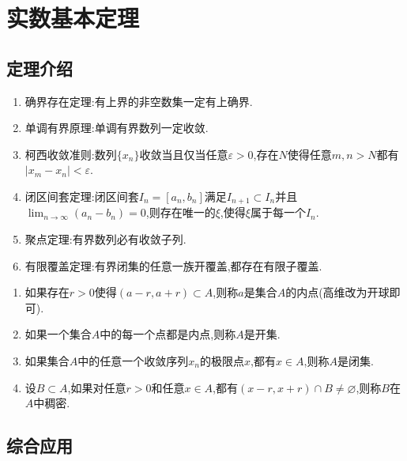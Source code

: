\documentclass[../../main.tex]{subfiles}
\begin{document}
\section{实数基本定理}

\subsection{定理介绍}

\begin{theorem}[实数基本定理]\label{theorem:实数基本定理}
\begin{enumerate}
\item 确界存在定理:有上界的非空数集一定有上确界.
\item 单调有界原理:单调有界数列一定收敛.
\item 柯西收敛准则:数列\(\{x_n\}\)收敛当且仅当任意\(\varepsilon > 0\),存在\(N\)使得任意\(m,n > N\)都有\(\vert x_m - x_n\vert < \varepsilon\).
\item 闭区间套定理:闭区间套\(I_n = [a_n,b_n]\)满足\(I_{n + 1} \subset I_n\)并且\(\lim_{n \to \infty} (a_n - b_n) = 0\),则存在唯一的\(\xi\),使得\(\xi\)属于每一个\(I_n\).
\item 聚点定理:有界数列必有收敛子列.
\item 有限覆盖定理:有界闭集的任意一族开覆盖,都存在有限子覆盖.
\end{enumerate}
\end{theorem}

\begin{definition}[点集相关概念]\label{definition:点集相关概念}
\begin{enumerate}
\item 如果存在\(r > 0\)使得\((a - r,a + r) \subset A\),则称\(a\)是集合\(A\)的内点(高维改为开球即可).
\item 如果一个集合\(A\)中的每一个点都是内点,则称\(A\)是开集.
\item 如果集合\(A\)中的任意一个收敛序列\(x_n\)的极限点\(x\),都有\(x\in A\),则称\(A\)是闭集.
\item 设\(B\subset A\),如果对任意\(r > 0\)和任意\(x\in A\),都有\((x - r,x + r)\cap B\neq\varnothing\),则称\(B\)在\(A\)中稠密.
\end{enumerate}
\end{definition}

\subsection{综合应用}
\end{document}

